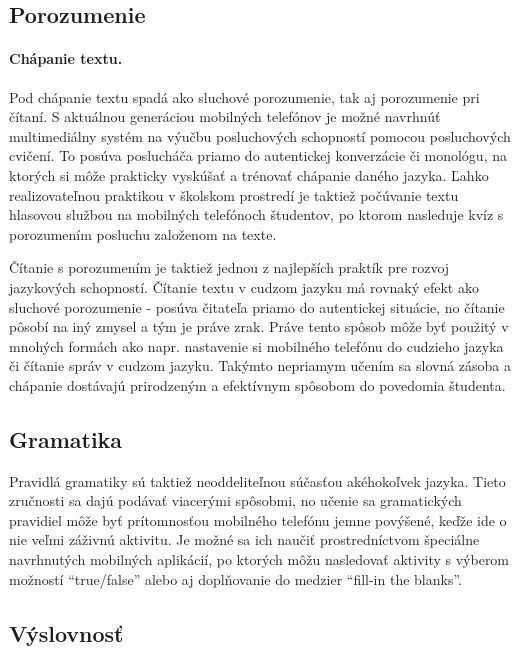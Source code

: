 \documentclass[10pt,oneside,slovak,a4paper]{article}
\begin{document}
\subsection{Porozumenie} \label{mall:porozumenie}

\paragraph{Chápanie textu.}
Pod chápanie textu spadá ako sluchové porozumenie, tak aj porozumenie pri čítaní. S aktuálnou generáciou mobilných telefónov je možné navrhnúť multimediálny systém na výučbu posluchových schopností pomocou posluchových cvičení\cite{Miangah2012}. To posúva poslucháča priamo do autentickej konverzácie či monológu, na ktorých si môže prakticky vyskúšať a trénovať chápanie daného jazyka. Ľahko realizovateľnou praktikou v školskom prostredí je taktiež počúvanie textu hlasovou službou na mobilných telefónoch študentov, po ktorom nasleduje kvíz s porozumením posluchu založenom na texte.

Čítanie s porozumením je taktiež jednou z najlepších praktík pre rozvoj jazykových schopností. Čítanie textu v cudzom jazyku má rovnaký efekt ako sluchové porozumenie - posúva čitateľa priamo do autentickej situácie, no čítanie pôsobí na iný zmysel a tým je práve zrak. Práve tento spôsob môže byť použitý v mnohých formách ako napr. nastavenie si mobilného telefónu do cudzieho jazyka či čítanie správ v cudzom jazyku. Takýmto nepriamym učením sa slovná zásoba a chápanie dostávajú prirodzeným a efektívnym spôsobom do povedomia študenta.

\subsection{Gramatika} \label{mall:gramatika}

Pravidlá gramatiky sú taktiež neoddeliteľnou súčasťou akéhokoľvek jazyka. Tieto zručnosti sa dajú podávať viacerými spôsobmi, no učenie sa gramatických pravidiel môže byť prítomnosťou mobilného telefónu jemne povýšené, keďže ide o nie veľmi záživnú aktivitu. Je možné sa ich naučiť prostredníctvom špeciálne navrhnutých mobilných aplikácií, po ktorých môžu nasledovať aktivity s výberom možností \enquote{true/false} alebo aj doplňovanie do medzier \enquote{fill-in the blanks}. 


\subsection{Výslovnosť} \label{mall:vyslovnost}
\end{document}
